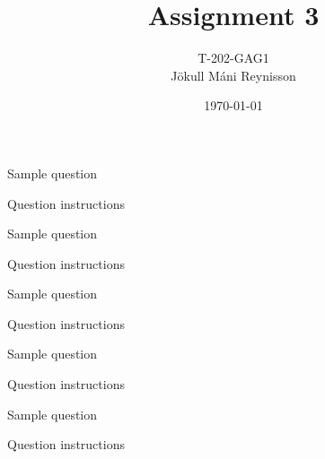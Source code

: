 \documentclass[11pt]{exam}
\begin{document}
\title{Assignment 3}
\author{{\small T-202-GAG1} \\ Jökull Máni Reynisson}
\date{\today}
\maketitle



\begin{questions}


	\question Sample question


	\quad

	Question instructions
	
	\begin{framed}
		
		
	\end{framed}



	\question Sample question


	\quad

	Question instructions
	
	\begin{framed}
		
		
	\end{framed}



	\question Sample question


	\quad

	Question instructions
	
	\begin{framed}
		
		
	\end{framed}



	\question Sample question


	\quad

	Question instructions
	
	\begin{framed}
		
		
	\end{framed}



	\question Sample question


	\quad

	Question instructions
	
	\begin{framed}
		
		
	\end{framed}

\end{questions}
\end{document}
